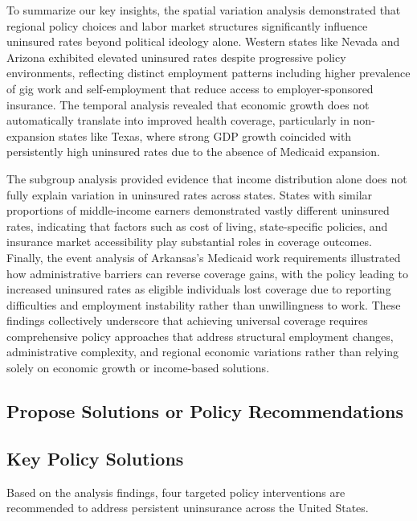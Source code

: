 \documentclass[
]{article}
\begin{document}
To summarize our key insights, the spatial variation analysis
demonstrated that regional policy choices and labor market structures
significantly influence uninsured rates beyond political ideology alone.
Western states like Nevada and Arizona exhibited elevated uninsured
rates despite progressive policy environments, reflecting distinct
employment patterns including higher prevalence of gig work and
self-employment that reduce access to employer-sponsored insurance. The
temporal analysis revealed that economic growth does not automatically
translate into improved health coverage, particularly in non-expansion
states like Texas, where strong GDP growth coincided with persistently
high uninsured rates due to the absence of Medicaid expansion.

The subgroup analysis provided evidence that income distribution alone
does not fully explain variation in uninsured rates across states.
States with similar proportions of middle-income earners demonstrated
vastly different uninsured rates, indicating that factors such as cost
of living, state-specific policies, and insurance market accessibility
play substantial roles in coverage outcomes. Finally, the event analysis
of Arkansas's Medicaid work requirements illustrated how administrative
barriers can reverse coverage gains, with the policy leading to
increased uninsured rates as eligible individuals lost coverage due to
reporting difficulties and employment instability rather than
unwillingness to work. These findings collectively underscore that
achieving universal coverage requires comprehensive policy approaches
that address structural employment changes, administrative complexity,
and regional economic variations rather than relying solely on economic
growth or income-based solutions.

\subsection{Propose Solutions or Policy
Recommendations}\label{propose-solutions-or-policy-recommendations}

\subsection{Key Policy Solutions}\label{key-policy-solutions}

Based on the analysis findings, four targeted policy interventions are
recommended to address persistent uninsurance across the United States.
\end{document}
